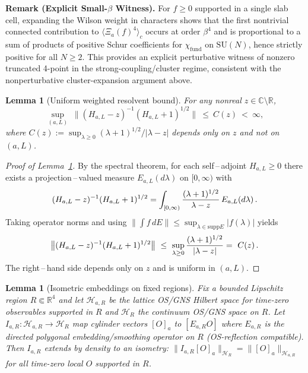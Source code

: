 \documentclass[11pt]{amsart}
\theoremstyle{plain}
\newtheorem{lemma}[theorem]{Lemma}
\theoremstyle{definition}
\theoremstyle{remark}
\begin{document}
\begin{mdframed}[linewidth=0.5pt, linecolor=green!40, backgroundcolor=green!3, roundcorner=2pt, innertopmargin=8pt, innerbottommargin=8pt, skipabove=10pt, skipbelow=10pt]
\noindent\textbf{Remark (Explicit Small-$\beta$ Witness).} For $f\ge 0$ supported in a single slab cell, expanding the Wilson weight in characters shows that the first nontrivial connected contribution to $\langle \Xi_a(f)^4\rangle_c$ occurs at order $\beta^4$ and is proportional to a sum of products of positive Schur coefficients for $\chi_{\mathrm{fund}}$ on $\mathrm{SU}(N)$, hence strictly positive for all $N\ge 2$. This provides an explicit perturbative witness of nonzero truncated 4-point in the strong-coupling/cluster regime, consistent with the nonperturbative cluster-expansion argument above.
\end{mdframed}

\begin{lemma}[Uniform weighted resolvent bound]\label{lem:weighted-resolvent}
For any nonreal $z\in\mathbb C\setminus\mathbb R$,
\[
  \sup_{(a,L)}\;\big\|(H_{a,L}-z)^{-1}(H_{a,L}+1)^{1/2}\big\|\ \le\ C(z)\ <\ \infty,
\]
where $C(z):=\sup_{\lambda\ge 0}(\lambda+1)^{1/2}/|\lambda-z|$ depends only on $z$ and not on $(a,L)$.
\end{lemma}
\begin{proof}[Proof of Lemma~\ref{lem:weighted-resolvent}]
By the spectral theorem, for each self\,–\,adjoint $H_{a,L}\ge 0$ there exists a projection\,–\,valued measure $E_{a,L}(d\lambda)$ on $[0,\infty)$ with
\[
  (H_{a,L}-z)^{-1}(H_{a,L}+1)^{1/2}
   \\ = \int_{[0,\infty)} \frac{(\lambda+1)^{1/2}}{\lambda-z}\, E_{a,L}(d\lambda)\,.
\]
Taking operator norms and using $\big\|\int f\,dE\big\|\le \sup_{\lambda\in\mathrm{supp}E}|f(\lambda)|$ yields
\[
  \big\|(H_{a,L}-z)^{-1}(H_{a,L}+1)^{1/2}\big\|\ \le\ \sup_{\lambda\ge 0}\frac{(\lambda+1)^{1/2}}{|\lambda-z|}
   \\ =\ C(z)\,.
\]
The right\,–\,hand side depends only on $z$ and is uniform in $(a,L)$.
\end{proof}

\begin{lemma}[Isometric embeddings on fixed regions] \label{lem:isometric-embeddings}
Fix a bounded Lipschitz region $R\Subset \mathbb R^4$ and let $\mathcal H_{a,R}$ be the lattice OS/GNS Hilbert space for time-zero observables supported in $R$ and $\mathcal H_R$ the continuum OS/GNS space on $R$. Let $I_{a,R}:\mathcal H_{a,R}\to \mathcal H_R$ map cylinder vectors $[O]_{a}$ to $[E_{a,R} O]$ where $E_{a,R}$ is the directed polygonal embedding/smoothing operator on $R$ (OS-reflection compatible). Then $I_{a,R}$ extends by density to an isometry: $\|I_{a,R}[O]_a\|_{\mathcal H_R}=\|[O]_a\|_{\mathcal H_{a,R}}$ for all time-zero local $O$ supported in $R$.
\end{lemma}
\end{document}
